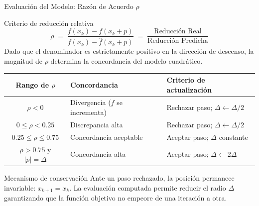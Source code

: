 \begin{frame}{Evaluación del Modelo: Razón de Acuerdo \(\rho\)}
    \begin{block}{Criterio de reducción relativa}
        \small
        \[
            \rho \;=\;
            \frac{f(x_k) - f(x_k+p)}{f(x_k) - \hat f(x_k+p)}
            \;=\;
            \frac{\text{Reducción Real}}{\text{Reducción Predicha}}
        \]
        Dado que el denominador es estrictamente positivo en la dirección de descenso, la magnitud de \(\rho\) determina la concordancia del modelo cuadrático.
    \end{block}

    \vspace{0.4em}
    \begin{center}
    \scriptsize
    \begin{tabular}{c l l}
        \toprule
        Rango de \(\rho\) & Concordancia & Criterio de actualización \\
        \midrule
        \(\rho < 0\)                   & Divergencia (\(f\) se incrementa) & Rechazar paso; \(\Delta \gets \Delta/2\) \\
        \(0 \le \rho < 0.25\)          & Discrepancia alta               & Rechazar paso; \(\Delta \gets \Delta/2\) \\
        \(0.25 \le \rho \le 0.75\)     & Concordancia aceptable          & Aceptar paso; \(\Delta\) constante \\
        \(\rho > 0.75\) y \(|p|=\Delta\) & Concordancia alta               & Aceptar paso; \(\Delta \gets 2\Delta\) \\
        \bottomrule
    \end{tabular}
    \end{center}

    \vspace{0.5em}
    \footnotesize
    \begin{alertblock}{Mecanismo de conservación}
        \scriptsize
        Ante un paso rechazado, la posición permanece invariable: \(x_{k+1} = x_k\). La evaluación computada permite reducir el radio \(\Delta\) garantizando que la función objetivo no empeore de una iteración a otra.
    \end{alertblock}
\end{frame}

